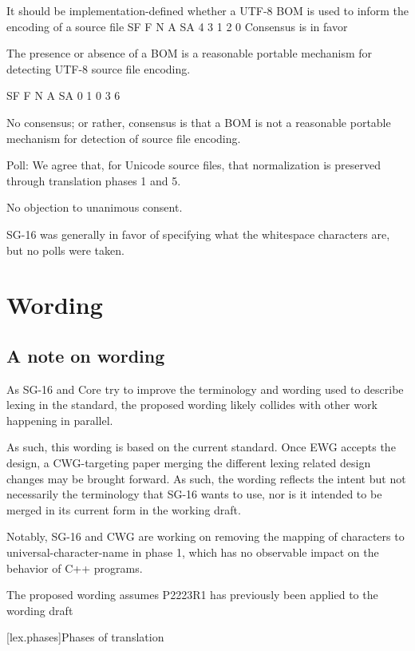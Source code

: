 \documentclass{wg21}
\begin{document}
\begin{codeblock}


It should be implementation-defined whether a UTF-8 BOM is used to inform the encoding of a source file
SF	F	N	A	SA
4	3	1	2	0
Consensus is in favor

The presence or absence of a BOM is a reasonable portable mechanism
for detecting UTF-8 source file encoding.

SF	F	N	A	SA
0	1	0	3	6

No consensus;  or rather,
consensus is that a BOM is not a reasonable portable mechanism for detection of source file encoding.


Poll: We agree that, for Unicode source files, that normalization is preserved
through translation phases 1 and 5.

No objection to unanimous consent.

\end{codeblock}

SG-16 was generally in favor of specifying what the whitespace characters are, but no polls were taken.

\section{Wording}

\subsection{A note on wording}

As SG-16 and Core try to improve the terminology and wording used to describe lexing in the standard,
the proposed wording likely collides with other work happening in parallel.

As such, this wording is based on the current standard.
Once EWG accepts the design, a CWG-targeting paper merging the different lexing related design changes may be brought forward.
As such, the wording reflects the intent but not necessarily the terminology that SG-16 wants to use, nor is it intended to be merged in its current form in the working draft.

Notably, SG-16 and CWG are working on removing the mapping of characters to universal-character-name in phase 1, which has no observable impact on the behavior of C++ programs.

The proposed wording assumes P2223R1 has previously been applied to the wording draft


[lex.phases]{Phases of translation}%
\end{document}
